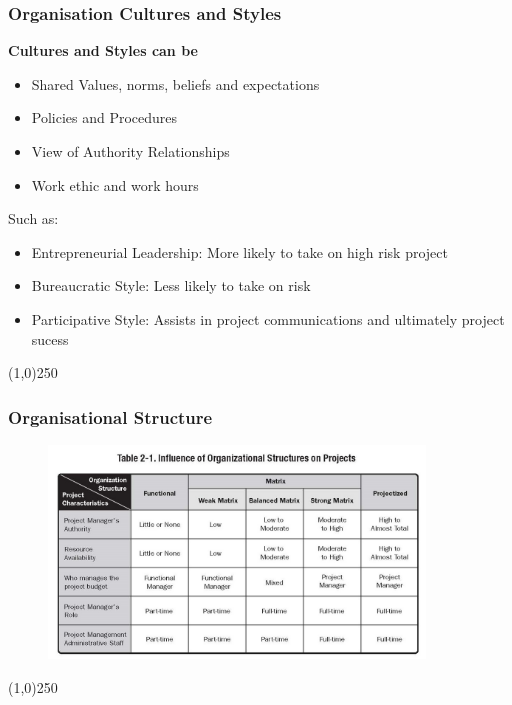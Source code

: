 \begin{frame}
\frametitle{Organisation Cultures and Styles}
\textbf{Cultures and Styles can be}\\
		\begin{itemize}
			\item Shared Values, norms, beliefs and expectations
			\item Policies and Procedures
			\item View of Authority Relationships
			\item Work ethic and work hours
		\end{itemize}
Such as:\\
\begin{itemize}
	\item Entrepreneurial Leadership: More likely to take on high risk project
	\item Bureaucratic Style: Less likely to take on risk
	\item Participative Style: Assists in project communications and ultimately project sucess
\end{itemize}
\end{frame}
\begin{center}\line(1,0){250}\end{center}



\begin{frame}
\frametitle{Organisational Structure}
 \begin{figure}
 	\centering
 		\includegraphics[width = 10cm]{images/tbl2-1.jpg}
 	\label{tbl:2-1b}
 \end{figure}
\end{frame}
\begin{center}\line(1,0){250}\end{center}



